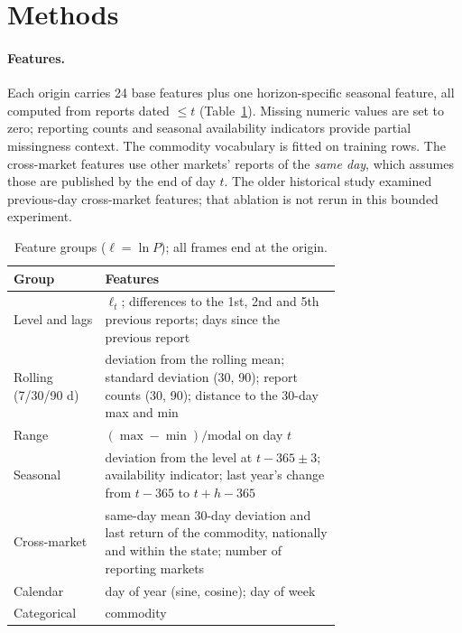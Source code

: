 \section{Methods}\label{sec:methods}

\paragraph{Features.}
Each origin carries 24 base features plus one horizon-specific seasonal feature, all computed from reports dated $\le t$ (Table~\ref{tab:features}).
Missing numeric values are set to zero; reporting counts and seasonal availability indicators provide partial missingness context. The commodity vocabulary is fitted on training rows.
The cross-market features use other markets' reports of the \emph{same day}, which assumes those are published by the end of day $t$.
The older historical study examined previous-day cross-market features; that ablation is not rerun in this bounded experiment.

\begin{table}[t]\centering\small
\caption{Feature groups ($\ell=\ln P$); all frames end at the origin.}\label{tab:features}
\begin{tabular}{@{}lp{0.72\linewidth}@{}}\toprule
Group & Features\\\midrule
Level and lags & $\ell_t$; differences to the 1st, 2nd and 5th previous reports; days since the previous report\\
Rolling (7/30/90 d) & deviation from the rolling mean; standard deviation (30, 90); report counts (30, 90); distance to the 30-day max and min\\
Range & $(\max-\min)/\text{modal}$ on day $t$\\
Seasonal & deviation from the level at $t-365\pm3$; availability indicator; last year's change from $t-365$ to $t+h-365$\\
Cross-market & same-day mean 30-day deviation and last return of the commodity, nationally and within the state; number of reporting markets\\
Calendar & day of year (sine, cosine); day of week\\
Categorical & commodity\\\bottomrule
\end{tabular}\end{table}

